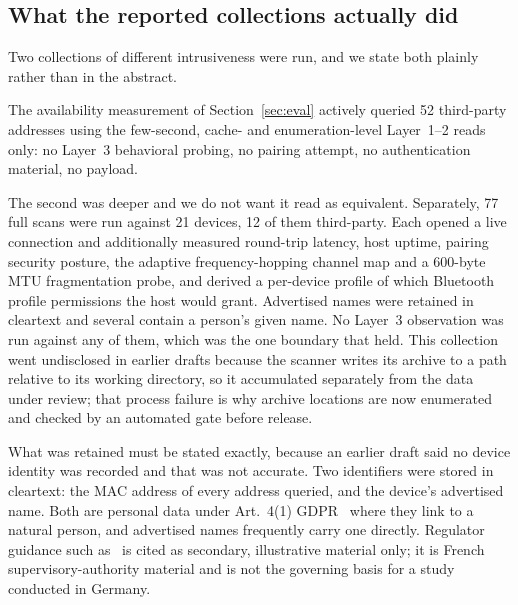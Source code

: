 \documentclass[conference]{IEEEtran}
\begin{document}
\subsection{What the reported collections actually did}
Two collections of different intrusiveness were run, and we state both plainly
rather than in the abstract.

The availability measurement of Section~\ref{sec:eval} actively queried 52
third-party addresses using the few-second, cache- and enumeration-level
Layer~1--2 reads only: no Layer~3 behavioral probing, no pairing attempt, no
authentication material, no payload.

The second was deeper and we do not want it read as equivalent. Separately,
77 full scans were run against 21 devices, 12 of them third-party. Each opened
a live connection and additionally measured round-trip latency, host uptime,
pairing security posture, the adaptive frequency-hopping channel map and a
600-byte MTU fragmentation probe, and derived a per-device profile of which
Bluetooth profile permissions the host would grant. Advertised names were
retained in cleartext and several contain a person's given name. No Layer~3
observation was run against any of them, which was the one boundary that held.
This collection went undisclosed in earlier drafts because the scanner writes
its archive to a path relative to its working directory, so it accumulated
separately from the data under review; that process failure is why archive
locations are now enumerated and checked by an automated gate before release.

What was retained must be stated exactly, because an earlier draft said no
device identity was recorded and that was not accurate. Two identifiers were
stored in cleartext: the MAC address of every address queried, and the
device's advertised name. Both are personal data under Art.~4(1)
GDPR~\cite{gdpr2016art4} where they link to a natural person, and advertised
names frequently carry one directly. Regulator guidance
such as~\cite{cnil2020macaudience} is cited as secondary, illustrative
material only; it is French supervisory-authority material and is not the
governing basis for a study conducted in Germany.
\end{document}

